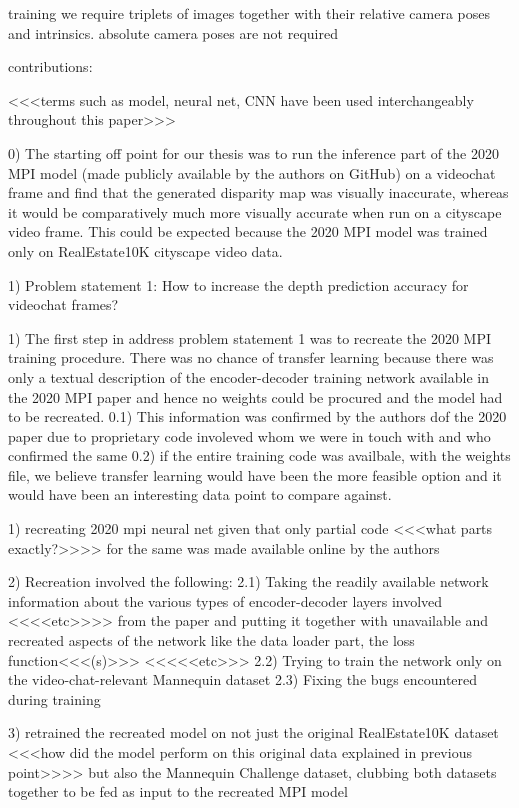training we require triplets of images together with their relative
camera poses and intrinsics.
absolute camera poses are not required



contributions:

<<<terms such as model, neural net, CNN have been used interchangeably throughout this paper>>>

0) The starting off point for our thesis was to run the inference part of the 2020 MPI model (made publicly available by the authors on GitHub) on a videochat frame and find that the generated disparity map was visually inaccurate, whereas it would be comparatively much more visually accurate when run on a cityscape video frame. This could be expected because the 2020 MPI model was trained only on RealEstate10K cityscape video data.   

1) Problem statement 1: How to increase the depth prediction accuracy for videochat frames? 

1) The first step in address problem statement 1 was to recreate the 2020 MPI training procedure. There was no chance of transfer learning because there was only a textual description of the encoder-decoder training network available in the 2020 MPI paper and hence no weights could be procured and the model had to be recreated. 
    0.1) This information was confirmed by the authors dof the 2020 paper due to proprietary code involeved whom we were in touch with and who confirmed the same
    0.2) if the entire training code was availbale, with the weights file, we believe transfer learning would have been the more feasible option and it would have been an interesting data point to compare against. 
    
1) recreating 2020 mpi neural net given that only partial code <<<what parts exactly?>>>> for the same was made available online by the authors 

2) Recreation involved the following:
    2.1) Taking the readily available network information about the various types of encoder-decoder layers involved <<<<etc>>>> from the paper and putting it together with unavailable and recreated aspects of the network like the data loader part, the loss function<<<(s)>>> <<<<<etc>>>
    2.2) Trying to train the network only on the video-chat-relevant Mannequin dataset
    2.3) Fixing the bugs encountered during training
    

3) retrained the recreated model on not just the original RealEstate10K dataset <<<how did the model perform on this original data explained in previous point>>>> but also the Mannequin Challenge dataset, clubbing both datasets together to be fed as input to the recreated MPI model

